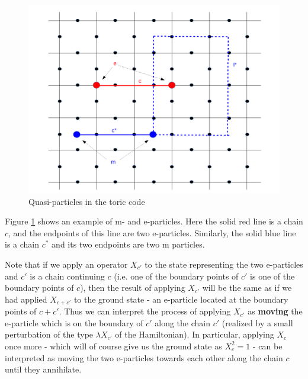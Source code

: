 \documentclass[a4paper, draft]{article}
\theoremstyle{own}
\theoremstyle{remark}
\begin{document}
\begin{figure}[ht]
\centering
\includegraphics[width=0.7\linewidth]{images/Anyons}
\caption[Quasi-particles in the toric code]{Quasi-particles in the toric code}
\label{fig:Anyons}
\end{figure}
 
Figure \ref{fig:Anyons} shows an example of m- and e-particles. Here the solid red line is a chain $c$, and the endpoints of this line are two e-particles. Similarly, the solid blue line is a chain $c^*$ and its two endpoints are two m particles. 

Note that if we apply an operator $X_{c'}$ to the state representing the two e-particles and $c'$ is a chain continuing $c$ (i.e. one of the boundary points of $c'$ is one of the boundary points of $c$), then the result of applying $X_{c'}$ will be the same as if we had applied $X_{c+c'}$ to the ground state - an e-particle located at the boundary points of $c + c'$. Thus we can interpret the process of applying $X_{c'}$ as {\bf moving} the e-particle which is on the boundary of $c'$ along the chain $c'$ (realized by a small perturbation of the type $\lambda X_{c'}$ of the Hamiltonian). In particular, applying $X_c$ once more - which will of course give us the ground state as $X_c^2 = 1$ - can be interpreted as moving the two e-particles towards each other along the chain $c$ until they annihilate. 
\end{document}
